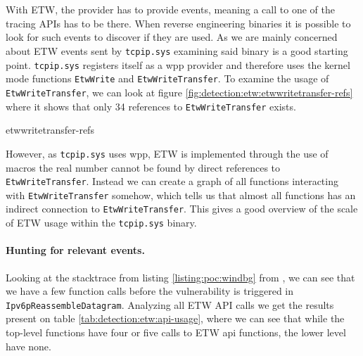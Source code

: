 \documentclass{report}
\begin{document}
\section{}
\label{sec:detection:etw}
With \gls{ETW}, the provider has to provide events, meaning a call to one of the tracing APIs has to be there. When reverse engineering binaries it is possible to look for such events to discover if they are used. As we are mainly concerned about \gls{ETW} events sent by \texttt{tcpip.sys} examining said binary is a good starting point. \texttt{tcpip.sys} registers itself as a \gls{wpp} provider and therefore uses the kernel mode functions \texttt{EtwWrite} and \texttt{EtwWriteTransfer}\cite{url:etw:kernel-mode-functions}. To examine the usage of \texttt{EtwWriteTransfer}, we can look at figure \ref{fig:detection:etw:etwwritetransfer-refs} where it shows that only 34 references to \texttt{EtwWriteTransfer} exists.

{etwwritetransfer-refs}

However, as \texttt{tcpip.sys} uses \gls{wpp}, \gls{ETW} is implemented through the use of macros\cite{url:etw:wpp:kernel-drivers} the real number cannot be found by direct references to \texttt{EtwWriteTransfer}. Instead we can create a graph of all functions interacting with \texttt{EtwWriteTransfer} somehow, which tells us that almost all functions has an indirect connection to \texttt{EtwWriteTransfer}. This gives a good overview of the scale of \gls{ETW} usage within the \texttt{tcpip.sys} binary.

\paragraph{Hunting for relevant events.} Looking at the stacktrace from listing \ref{listing:poc:windbg} from , we can see that we have a few function calls before the vulnerability is triggered in \texttt{Ipv6pReassembleDatagram}. Analyzing all \gls{ETW} API calls we get the results present on table \ref{tab:detection:etw:api-usage}, where we can see that while the top-level functions have four or five calls to \gls{ETW} api functions, the lower level have none.
\end{document}
